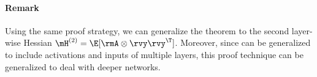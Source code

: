 \paragraph{Remark}
Using the same proof strategy, we can generalize the theorem to the second layer-wise Hessian $\mH^{(2)} = \E[\rmA\otimes \rvy\rvy^\T]$. Moreover, since  can be generalized to include activations and inputs of multiple layers, this proof technique can be generalized to deal with deeper networks.
\fi